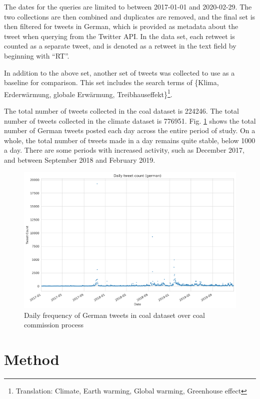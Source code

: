 \documentclass[12pt,onecolumn,twoside]{layout}
\begin{document}
The dates for the queries are limited to between 2017-01-01 and 2020-02-29. The two collections are then combined and duplicates are removed, and the final set is then filtered for tweets in German, which is provided as metadata about the tweet when querying from the Twitter API. In the data set, each retweet is counted as a separate tweet, and is denoted as a retweet in the text field by beginning with ``RT''. 

In addition to the above set, another set of tweets was collected to use as a baseline for comparison. This set includes the search terms of \{Klima, Erderwärmung, globale Erwärmung, Treibhauseffekt\}\footnote{Translation: Climate, Earth warming, Global warming, Greenhouse effect}.

The total number of tweets collected in the coal dataset is 224246. The total number of tweets collected in the climate dataset is 776951. Fig. \ref{fig:tweet_frequency} shows the total number of German tweets posted each day across the entire period of study. On a whole, the total number of tweets made in a day remains quite stable, below 1000 a day. There are some periods with increased activity, such as December 2017, and between September 2018 and February 2019. 

\begin{figure} 
	\begin{center}
		\includegraphics[width=0.9\linewidth]{figures/sa_tweet_frequency_zoom2}
	\end{center}
	\caption{Daily frequency of German tweets in coal dataset over coal commission process}
	\label{fig:tweet_frequency}
\end{figure}

\section*{Method} \label{sec:method}
\end{document}
